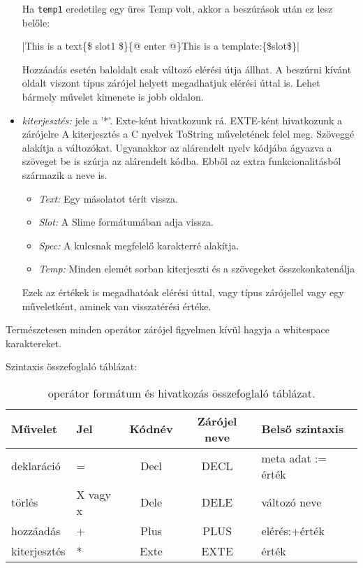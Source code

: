 \begin{itemize}
Ha \texttt{temp1} eredetileg egy üres Temp volt, akkor a beszúrások után ez lesz belőle:

{|This is a text\{\$ slot1 \$\}\{@ enter @\}This is a template:\{\$slot\$\}|}

Hozzáadás esetén baloldalt csak változó elérési útja állhat.
A beszúrni kívánt oldalt viszont típus zárójel helyett megadhatjuk elérési úttal is.
Lehet bármely művelet kimenete is jobb oldalon.
\item \emph{kiterjesztés:}
jele a '*'.
Exte-ként hivatkozunk rá.
EXTE-ként hivatkozunk a zárójelre
A kiterjesztés a C nyelvek ToString műveletének felel meg. 
Szöveggé alakítja a változókat.
Ugyanakkor az alárendelt nyelv kódjába ágyazva a szöveget be is szúrja az alárendelt kódba. 
Ebből az extra funkcionalitásból származik a neve is.
\begin{itemize}
\item\emph{Text:} Egy másolatot térít vissza.
\item\emph{Slot:} A Slime formátumában adja vissza.
\item\emph{Spec:} A kulcsnak megfelelő karakterré alakítja.
\item\emph{Temp:} Minden elemét sorban kiterjeszti és a szövegeket összekonkatenálja
\end{itemize}
Ezek az értékek is megadhatóak elérési úttal, vagy típus zárójellel vagy egy műveletként, aminek van visszatérési értéke.
\end{itemize}

Természetesen minden operátor zárójel figyelmen kívül hagyja a whitespace karaktereket.

Szintaxis összefoglaló táblázat:
\begin{table}
\begin{center}
  \begin{tabular}{ | l | l | c | c | l |}
    \hline
    \textbf{Művelet}	& \textbf{Jel}	& \textbf{Kódnév}	& \textbf{Zárójel neve}	& \textbf{Belső szintaxis}	\\ \hline
    deklaráció			& = 			& Decl		 		& DECL					& meta adat := érték		\\ \hline
    törlés				& X vagy x		& Dele		 		& DELE					& változó neve				\\ \hline
    hozzáadás			& + 			& Plus		 		& PLUS					& elérés:+érték				\\ \hline
    kiterjesztés		& * 			& Exte		 		& EXTE					& érték						\\
    \hline
  \end{tabular}
\end{center}
\label{table:operBasic}
\caption{operátor formátum és hivatkozás összefoglaló táblázat.}
\end{table}

